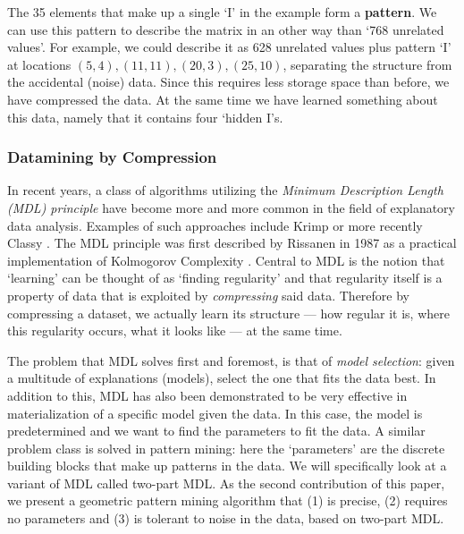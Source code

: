 \documentclass{llncs}
\begin{document}
The 35 elements that make up a single `I' in the example form a \textbf{pattern}. We can use this pattern to describe the matrix in an other way than `768 unrelated values'. For example, we could describe it as 628 unrelated values plus pattern `I' at locations $(5,4), (11,11), (20,3), (25,10)$, separating the structure from the accidental (noise) data. Since this requires less storage space than before, we have compressed the data. At the same time we have learned something about this data, namely that it contains four `hidden I's. 



\subsubsection{Datamining by Compression}
 
In recent years, a class of algorithms utilizing the \emph{Minimum Description Length (MDL) principle} \cite{rissanenmdl,grunwaldmdl} have become more and more common in the field of explanatory data analysis. Examples of such approaches include Krimp \cite{krimp} or more recently Classy \cite{classy}. The  MDL principle was first described by Rissanen in 1987 \cite{rissanenmdl} as a practical implementation of Kolmogorov Complexity \cite{kolmogorov}. Central to MDL is the notion that `learning' can be thought of as `finding regularity' and that regularity itself is a property of data that is exploited by \emph{compressing} said data. Therefore by compressing a dataset, we actually learn its structure --- how regular it is, where this regularity occurs, what it looks like --- at the same time. %

The problem that MDL solves first and foremost, is that of \emph{model selection}: given a multitude of explanations (models), select the one that fits the data best. In addition to this, MDL has also been demonstrated to be very effective in materialization of a specific model given the data. In this case, the model is predetermined and we want to find the parameters to fit the data. A similar problem class is solved in pattern mining: here the `parameters' are the discrete building blocks that make up patterns in the data. We will specifically look at a variant of MDL called two-part MDL. As the second contribution of this paper, we present a geometric pattern mining algorithm that (1) is precise, (2) requires no parameters and (3) is tolerant to noise in the data, based on two-part MDL.
 
\end{document}
